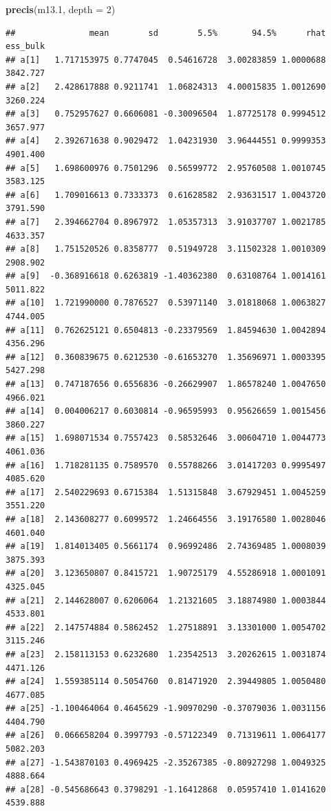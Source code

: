 \documentclass[
]{book}
\newenvironment{Shaded}{\begin{snugshade}}{\end{snugshade}}
\newcommand{\AttributeTok}[1]{\textcolor[rgb]{0.13,0.29,0.53}{#1}}
\newcommand{\DecValTok}[1]{\textcolor[rgb]{0.00,0.00,0.81}{#1}}
\newcommand{\FloatTok}[1]{\textcolor[rgb]{0.00,0.00,0.81}{#1}}
\newcommand{\FunctionTok}[1]{\textcolor[rgb]{0.13,0.29,0.53}{\textbf{#1}}}
\newcommand{\NormalTok}[1]{#1}
\begin{document}
\begin{Shaded}
\begin{Highlighting}[]
\FunctionTok{precis}\NormalTok{(m13}\FloatTok{.1}\NormalTok{, }\AttributeTok{depth =} \DecValTok{2}\NormalTok{)}
\end{Highlighting}
\end{Shaded}

\begin{verbatim}
##               mean        sd        5.5%       94.5%      rhat ess_bulk
## a[1]   1.717153975 0.7747045  0.54616728  3.00283859 1.0000688 3842.727
## a[2]   2.428617888 0.9211741  1.06824313  4.00015835 1.0012690 3260.224
## a[3]   0.752957627 0.6606081 -0.30096504  1.87725178 0.9994512 3657.977
## a[4]   2.392671638 0.9029472  1.04231930  3.96444551 0.9999353 4901.400
## a[5]   1.698600976 0.7501296  0.56599772  2.95760508 1.0010745 3583.125
## a[6]   1.709016613 0.7333373  0.61628582  2.93631517 1.0043720 3791.590
## a[7]   2.394662704 0.8967972  1.05357313  3.91037707 1.0021785 4633.357
## a[8]   1.751520526 0.8358777  0.51949728  3.11502328 1.0010309 2908.902
## a[9]  -0.368916618 0.6263819 -1.40362380  0.63108764 1.0014161 5011.822
## a[10]  1.721990000 0.7876527  0.53971140  3.01818068 1.0063827 4744.005
## a[11]  0.762625121 0.6504813 -0.23379569  1.84594630 1.0042894 4356.296
## a[12]  0.360839675 0.6212530 -0.61653270  1.35696971 1.0003395 5427.298
## a[13]  0.747187656 0.6556836 -0.26629907  1.86578240 1.0047650 4966.021
## a[14]  0.004006217 0.6030814 -0.96595993  0.95626659 1.0015456 3860.227
## a[15]  1.698071534 0.7557423  0.58532646  3.00604710 1.0044773 4061.036
## a[16]  1.718281135 0.7589570  0.55788266  3.01417203 0.9995497 4085.620
## a[17]  2.540229693 0.6715384  1.51315848  3.67929451 1.0045259 3551.220
## a[18]  2.143608277 0.6099572  1.24664556  3.19176580 1.0028046 4601.040
## a[19]  1.814013405 0.5661174  0.96992486  2.74369485 1.0008039 3875.393
## a[20]  3.123650807 0.8415721  1.90725179  4.55286918 1.0001091 4325.045
## a[21]  2.144628007 0.6206064  1.21321605  3.18874980 1.0003844 4533.801
## a[22]  2.147574884 0.5862452  1.27518891  3.13301000 1.0054702 3115.246
## a[23]  2.158113153 0.6232680  1.23542513  3.20262615 1.0031874 4471.126
## a[24]  1.559385114 0.5054760  0.81471920  2.39449805 1.0050480 4677.085
## a[25] -1.100464064 0.4645629 -1.90970290 -0.37079036 1.0031156 4404.790
## a[26]  0.066658204 0.3997793 -0.57122349  0.71319611 1.0064177 5082.203
## a[27] -1.543870103 0.4969425 -2.35267385 -0.80927298 1.0049325 4888.664
## a[28] -0.545686643 0.3798291 -1.16412868  0.05957410 1.0141620 4539.888

\end{verbatim}
\end{document}
